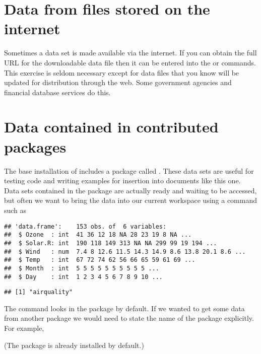 \section{Data from files stored on the internet} 
 
Sometimes a data set is made available via the internet. If you can obtain the full URL for the downloadable data file then it can be entered into the  or  commands. This exercise is seldom necessary except for data files that you know will be updated for distribution through the web. Some government agencies and financial database services do this. 
 
\section{Data contained in contributed packages} 
\label{DataFromPackages} 
 
 
The base installation of \R{} includes a package called . These data sets are useful for testing code and writing examples for insertion into documents like this one. Data sets contained in the  package are actually ready and waiting to be accessed, but often we want to bring the data into our current workspace using a command such as 
\begin{knitrout}
\color{fgcolor}\begin{kframe}
\begin{alltt}
\end{alltt}
\begin{verbatim}
## 'data.frame':	153 obs. of  6 variables:
##  $ Ozone  : int  41 36 12 18 NA 28 23 19 8 NA ...
##  $ Solar.R: int  190 118 149 313 NA NA 299 99 19 194 ...
##  $ Wind   : num  7.4 8 12.6 11.5 14.3 14.9 8.6 13.8 20.1 8.6 ...
##  $ Temp   : int  67 72 74 62 56 66 65 59 61 69 ...
##  $ Month  : int  5 5 5 5 5 5 5 5 5 5 ...
##  $ Day    : int  1 2 3 4 5 6 7 8 9 10 ...
\end{verbatim}
\begin{alltt}
\hlstd{()}
\end{alltt}
\begin{verbatim}
## [1] "airquality"
\end{verbatim}
\end{kframe}
\end{knitrout}
The  command looks in the  package by default. If we wanted to get some data from another package we would need to state the name of the package explicitly. For example, 
\begin{knitrout}
\color{fgcolor}\begin{kframe}
\begin{alltt}
 \hlstd{=}\hlstd{)}
\end{alltt}
\end{kframe}
\end{knitrout}
(The  package is already installed by default.)  
 
